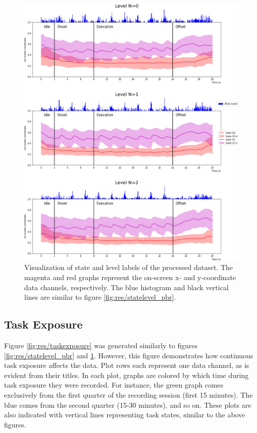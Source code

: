 \begin{figure}[h]
    \centering
    \includegraphics[width=\textwidth]{figures/impl_statelevelvisualization_xy.png}
    \caption{Visualization of state and level labels of the processed dataset. The magenta and red graphs represent the on-screen x- and y-coordinate data channels, respectively. The blue histogram and black vertical lines are similar to figure \ref{fig:res/statelevel_pbr}.}
    \label{fig:res/statelevel_xy}
\end{figure}

\subsection{Task Exposure}

Figure \ref{fig:res/taskexposure} was generated similarly to figures \ref{fig:res/statelevel_pbr} and \ref{fig:res/statelevel_xy}. However, this figure demonstrates how continuous task exposure affects the data. Plot rows each represent one data channel, as is evident from their titles. In each plot, graphs are colored by which time during task exposure they were recorded. For instance, the green graph comes exclusively from the first quarter of the recording session (first 15 minutes). The blue comes from the second quarter (15-30 minutes), and so on. These plots are also indicated with vertical lines representing task states, similar to the above figures.

